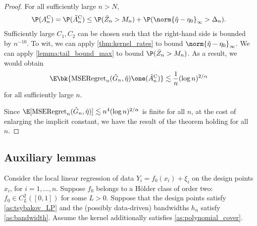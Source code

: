 \documentclass[12pt, reqno]{amsart}
\newcommand{\hateta}{\hat\eta}
\newcommand{\reg}{\mathrm{MSERegret}_n}
\newcommand{\comp}{\mathrm{C}}
\numberwithin{equation}{section}
\begin{document}
\begin{refsection}
\begin{appendices}
\begin{proof}
For all sufficiently large $n > N$, \[
\P(A_n^\comp) = \P(\tilde A_n^\comp) \le \P(\bar Z_n > M_n) + \P(\norm{\hateta -
\eta_0}_\infty > \Delta_n).
\]
Sufficiently large $C_1, C_2$ can be chosen such that the right-hand side is bounded by
$n^{-10}$. To wit, we can apply \cref{thm:kernel_rates} to bound $\norm{\hateta -
\eta_0}_\infty$. We can apply \cref{lemma:tail_bound_max} to bound $\P(\bar Z_n > M_n)$.
As a result, we would obtain \[
\E\bk{\reg(\hat G_n, \hateta) \one(\tilde A_n^\comp)} \lesssim \frac{1}{n}(\log n)^
{2/\alpha}
\]
for all sufficiently large $n$.

Since $\E[\reg(\hat G_n, \hateta)] \lesssim n^{4} (\log n)^{2/\alpha}$ is finite for all
$n$, at the cost of enlarging the implicit constant, we have the result of the theorem
holding for all $n$.
\end{proof}


\subsection{Auxiliary lemmas}


\begin{prop}
\label{prop:llr_large_dev}
Consider the local linear regression of data $Y_i = f_0(x_i) + \xi_i$ on the design points
$x_i$, for $i = 1,\ldots, n$. Suppose $f_0$ belongs to a H\"older class of order two:
$f_0 \in C_L^2([0,1])$ for some $L > 0$. Suppose that the design points satisfy
\cref{as:tsybakov_LP} and the (possibly data-driven) bandwidths $h_n$ satisfy
\cref{as:bandwidth}. Assume the kernel additionally satisfies \cref{as:polynomial_cover}.



\end{prop}
\end{appendices}
\end{refsection}
\end{document}
